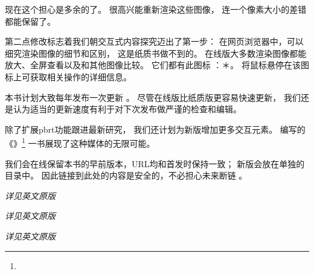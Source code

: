 现在这个担心是多余的了。
很高兴能重新渲染这些图像，
连一个像素大小的差错都能保留了。

第二点修改标志着我们朝交互式内容探究迈出了第一步：
在网页浏览器中，可以细究渲染图像的细节和区别，
这是纸质书做不到的。
在线版大多数渲染图像都能放大、全屏查看以及和其他图像比较。
它们都有此图标
：＊。
将鼠标悬停在该图标上可获取相关操作的详细信息。\\


本书计划大致每年发布一次更新
。
尽管在线版比纸质版更容易快速更新，
我们还是认为适当的更新速度有利于对下次发布做严谨的检查和编辑。

除了扩展pbrt功能跟进最新研究，
我们还计划为新版增加更多交互元素。
\citet{4b212a02-105c-42a2-ad5c-91c16a06e815}
编写的《》\footnote{}
一书展现了这种媒体的无限可能。

我们会在线保留本书的早前版本，URL均和首发时保持一致；
新版会放在单独的目录中。
因此链接到此处的内容是安全的，不必担心未来断链
。\\


{\itshape 详见英文原版}\\


{\itshape 详见英文原版}\\


{\itshape 详见英文原版}